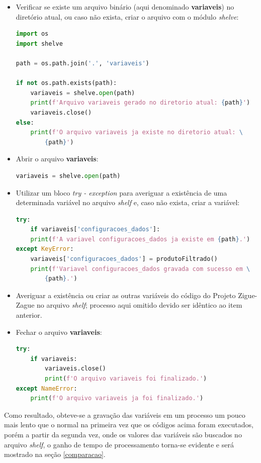 \documentclass[12pt]{article}
\begin{document}
\begin{itemize}
	\item Verificar se existe um arquivo binário (aqui denominado \textbf{variaveis}) no diretório atual, ou caso não exista, criar o arquivo com o módulo \textit{shelve}:
\begin{lstlisting}[language=Python]
import os
import shelve

path = os.path.join('.', 'variaveis')

if not os.path.exists(path):
	variaveis = shelve.open(path)
	print(f'Arquivo variaveis gerado no diretorio atual: {path}')
	variaveis.close()
else:
	print(f'O arquivo variaveis ja existe no diretorio atual: \
		{path}')
\end{lstlisting}
	
	\item Abrir o arquivo \textbf{variaveis}:
\begin{lstlisting}[language=Python]
variaveis = shelve.open(path)
\end{lstlisting} 
	
	\item Utilizar um bloco \textit{try - exception} para averiguar a existência de uma determinada variável no arquivo \textit{shelf} e, caso não exista, criar a variável:
\begin{lstlisting}[language=Python]
try:
	if variaveis['configuracoes_dados']:
	print(f'A variavel configuracoes_dados ja existe em {path}.')
except KeyError:
	variaveis['configuracoes_dados'] = produtoFiltrado()
	print(f'Variavel configuracoes_dados gravada com sucesso em \
		{path}.')
\end{lstlisting}
	
	\item Averiguar a existência ou criar as outras variáveis do código do Projeto Zigue-Zague no arquivo \textit{shelf}; processo aqui omitido devido ser idêntico ao item anterior.
	
	\item Fechar o arquivo \textbf{variaveis}:
\begin{lstlisting}[language=Python]
try:
	if variaveis:
		variaveis.close()
		print(f'O arquivo variaveis foi finalizado.')
except NameError:
	print(f'O arquivo variaveis ja foi finalizado.')
\end{lstlisting}
\end{itemize}

Como resultado, obteve-se a gravação das variáveis em um processo um pouco mais lento que o normal na primeira vez que os códigos acima foram executados, porém a partir da segunda vez, onde os valores das variáveis são buscados no arquivo \textit{shelf}, o ganho de tempo de processamento torna-se evidente e será mostrado na seção \ref{comparacao}.
\end{document}
